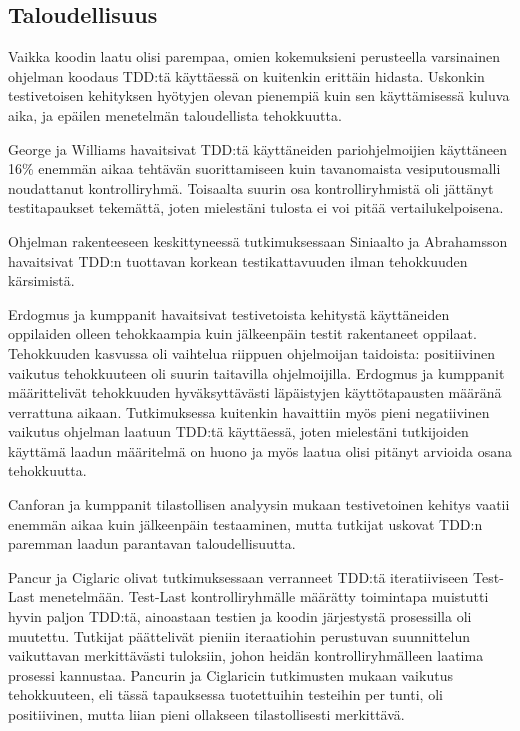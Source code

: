 \documentclass[finnish]{tktltiki2}
\theoremstyle{definition}
\theoremstyle{remark}
\begin{document}


\subsection{Taloudellisuus}

Vaikka koodin laatu olisi parempaa, omien kokemuksieni perusteella varsinainen ohjelman koodaus TDD:tä käyttäessä on kuitenkin erittäin hidasta. Uskonkin testivetoisen kehityksen hyötyjen olevan pienempiä kuin sen käyttämisessä kuluva aika, ja epäilen menetelmän taloudellista tehokkuutta.

George ja Williams \cite{George04} havaitsivat TDD:tä käyttäneiden pariohjelmoijien käyttäneen 16\% enemmän aikaa tehtävän suorittamiseen kuin tavanomaista vesiputousmalli noudattanut kontrolliryhmä. Toisaalta suurin osa kontrolliryhmistä oli jättänyt testitapaukset tekemättä, joten mielestäni tulosta ei voi pitää vertailukelpoisena.

Ohjelman rakenteeseen keskittyneessä tutkimuksessaan Siniaalto ja Abrahamsson \cite{Siniaalto07} havaitsivat TDD:n tuottavan korkean testikattavuuden ilman tehokkuuden kärsimistä.

Erdogmus ja kumppanit \cite{Erdogmus05} havaitsivat testivetoista kehitystä käyttäneiden oppilaiden olleen tehokkaampia kuin jälkeenpäin testit rakentaneet oppilaat. Tehokkuuden kasvussa oli vaihtelua riippuen ohjelmoijan taidoista: positiivinen vaikutus tehokkuuteen oli suurin taitavilla ohjelmoijilla. Erdogmus ja kumppanit määrittelivät tehokkuuden hyväksyttävästi läpäistyjen käyttötapausten määränä verrattuna aikaan. Tutkimuksessa kuitenkin havaittiin myös pieni negatiivinen vaikutus ohjelman laatuun TDD:tä käyttäessä, joten mielestäni tutkijoiden käyttämä laadun määritelmä on huono ja myös laatua olisi pitänyt arvioida osana tehokkuutta. 

Canforan ja kumppanit \cite{Canfora06} tilastollisen analyysin mukaan testivetoinen kehitys vaatii enemmän aikaa kuin jälkeenpäin testaaminen, mutta tutkijat uskovat TDD:n paremman laadun parantavan taloudellisuutta.

Pancur ja Ciglaric \cite{Pancur11} olivat tutkimuksessaan verranneet TDD:tä iteratiiviseen Test-Last menetelmään. Test-Last kontrolliryhmälle määrätty toimintapa muistutti hyvin paljon TDD:tä, ainoastaan testien ja koodin järjestystä prosessilla oli muutettu. Tutkijat päättelivät pieniin iteraatiohin perustuvan suunnittelun vaikuttavan merkittävästi tuloksiin, johon heidän kontrolliryhmälleen laatima prosessi kannustaa. Pancurin ja Ciglaricin tutkimusten mukaan vaikutus tehokkuuteen, eli tässä tapauksessa tuotettuihin testeihin per tunti,  oli positiivinen, mutta liian pieni ollakseen tilastollisesti merkittävä.
\end{document}
